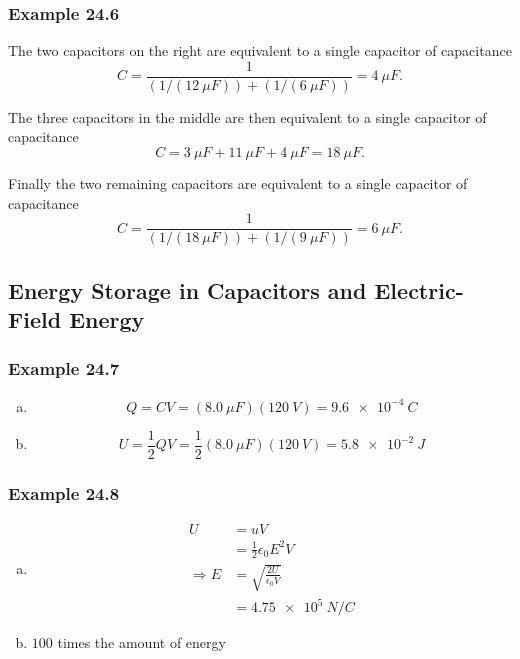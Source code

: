 \documentclass{article}
\begin{document}
\subsubsection{Example 24.6}

The two capacitors on the right are equivalent to a single capacitor of capacitance \[C = \frac{1}{(1 / (\qty{12}{\mu F})) + (1 / (\qty{6}{\mu F}))} = \qty{4}{\mu F}.\]

The three capacitors in the middle are then equivalent to a single capacitor of capacitance \[C = \qty{3}{\mu F} + \qty{11}{\mu F} + \qty{4}{\mu F} = \qty{18}{\mu F}.\]

Finally the two remaining capacitors are equivalent to a single capacitor of capacitance \[C = \frac{1}{(1 / (\qty{18}{\mu F})) + (1 / (\qty{9}{\mu F}))} = \qty{6}{\mu F}.\]

\subsection{Energy Storage in Capacitors and Electric-Field Energy}

\subsubsection{Example 24.7}

\begin{enumerate}[(a)]
  \item \[Q = C V = (\qty{8.0}{\mu F}) (\qty{120}{V}) = \qty{9.6e-4}{C}\]

  \item \[U = \frac{1}{2} Q V = \frac{1}{2} (\qty{8.0}{\mu F}) (\qty{120}{V}) = \qty{5.8e-2}{J}\]
\end{enumerate}

\subsubsection{Example 24.8}

\begin{enumerate}[(a)]
  \item

        \begin{align*}
          U             & = u V                             \\
                        & = \frac{1}{2} \epsilon_0 E^2 V    \\
          \Rightarrow E & = \sqrt{\frac{2 U}{\epsilon_0 V}} \\
                        & = \qty{4.75e5}{N/C}
        \end{align*}

  \item $100$ times the amount of energy
\end{enumerate}
\end{document}
